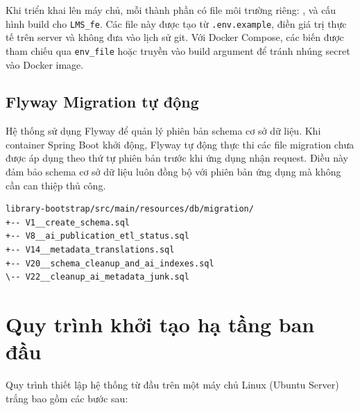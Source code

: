 Khi triển khai lên máy chủ, mỗi thành phần có file môi trường riêng:
,  và cấu hình build cho
\texttt{LMS\_fe}. Các file này được tạo từ \texttt{.env.example}, điền giá trị
thực tế trên server và không đưa vào lịch sử git. Với Docker Compose, các biến
được tham chiếu qua \texttt{env\_file} hoặc truyền vào build argument để tránh
nhúng secret vào Docker image.

\subsection{Flyway Migration tự động}

Hệ thống sử dụng Flyway để quản lý phiên bản schema cơ sở dữ liệu. Khi
container Spring Boot khởi động, Flyway tự động thực thi các file migration
chưa được áp dụng theo thứ tự phiên bản trước khi ứng dụng nhận request.
Điều này đảm bảo schema cơ sở dữ liệu luôn đồng bộ với phiên bản ứng dụng
mà không cần can thiệp thủ công.

\begin{verbatim}
library-bootstrap/src/main/resources/db/migration/
+-- V1__create_schema.sql
+-- V8__ai_publication_etl_status.sql
+-- V14__metadata_translations.sql
+-- V20__schema_cleanup_and_ai_indexes.sql
\-- V22__cleanup_ai_metadata_junk.sql
\end{verbatim}

\section{Quy trình khởi tạo hạ tầng ban đầu}

Quy trình thiết lập hệ thống từ đầu trên một máy chủ Linux (Ubuntu Server) trắng bao gồm các bước sau:

